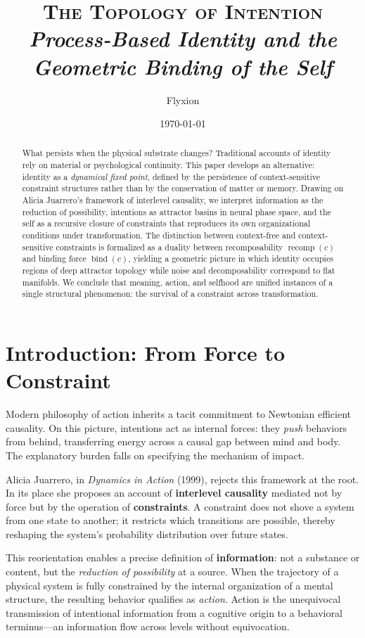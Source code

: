 \documentclass[11pt]{article}
\title{\textsc{The Topology of Intention}\\[0.4em]
{\normalsize\itshape Process-Based Identity and the Geometric Binding of the Self}}
\author{Flyxion}
\date{\today}
\newcommand{\bind}{\operatorname{bind}}
\newcommand{\recomp}{\operatorname{recomp}}
\begin{document}
\maketitle

\begin{abstract}
\noindent
What persists when the physical substrate changes? Traditional accounts of identity rely on
material or psychological continuity. This paper develops an alternative: identity as a
\emph{dynamical fixed point}, defined by the persistence of context-sensitive constraint
structures rather than by the conservation of matter or memory. Drawing on Alicia
Juarrero's framework of interlevel causality, we interpret information as the reduction of
possibility, intentions as attractor basins in neural phase space, and the self as a
recursive closure of constraints that reproduces its own organizational conditions under
transformation. The distinction between context-free and context-sensitive constraints is
formalized as a duality between recomposability $\recomp(c)$ and binding force $\bind(c)$,
yielding a geometric picture in which identity occupies regions of deep attractor topology
while noise and decomposability correspond to flat manifolds. We conclude that meaning,
action, and selfhood are unified instances of a single structural phenomenon: the
survival of a constraint across transformation.
\end{abstract}

\bigskip

\section{Introduction: From Force to Constraint}

Modern philosophy of action inherits a tacit commitment to Newtonian efficient causality.
On this picture, intentions act as internal forces: they \emph{push} behaviors from
behind, transferring energy across a causal gap between mind and body. The explanatory
burden falls on specifying the mechanism of impact.

Alicia Juarrero, in \textit{Dynamics in Action} (1999), rejects this framework at the root.
In its place she proposes an account of \textbf{interlevel causality} mediated not by
force but by the operation of \textbf{constraints}. A constraint does not shove a system
from one state to another; it restricts which transitions are possible, thereby reshaping
the system's probability distribution over future states.

This reorientation enables a precise definition of \textbf{information}: not a substance
or content, but the \emph{reduction of possibility} at a source. When the trajectory of a
physical system is fully constrained by the internal organization of a mental structure,
the resulting behavior qualifies as \emph{action}. Action is the unequivocal transmission
of intentional information from a cognitive origin to a behavioral terminus—an information
flow across levels without equivocation.
\end{document}
